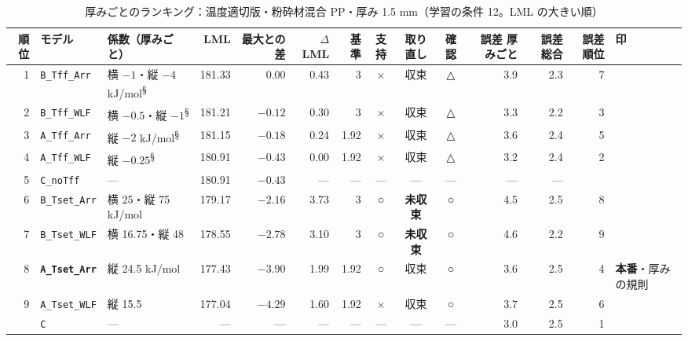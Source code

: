 \documentclass[paper=a4paper,landscape,fontsize=10pt,line_length=62zw,number_of_lines=34]{jlreq}
\let\origtextbf\textbf
\renewcommand{\textbf}[1]{\origtextbf{\gtfamily #1}}   %
\begin{document}
\begin{table}[H]\centering\footnotesize
\caption{厚みごとのランキング：温度適切版・粉砕材混合 PP・厚み 1.5 mm（学習の条件 12。LML の大きい順）}
\begin{tabular}{rlp{11\zw}rrrrccc rrrl}
\toprule
順位 & モデル & 係数（厚みごと） & LML & 最大との差 & $\Delta$LML & 基準 & 支持 & 取り直し & 確認 & 誤差 厚みごと & 誤差 総合 & 誤差順位 & 印 \\
\midrule
1 & \texttt{B\_\allowbreak{}Tff\_\allowbreak{}Arr} & 横 $-1$・縦 $-4$ kJ/mol\textsuperscript{§} & 181.33 & 0.00 & 0.43 & 3 & × & 収束 & △ & 3.9 & 2.3 & 7 &  \\
2 & \texttt{B\_\allowbreak{}Tff\_\allowbreak{}WLF} & 横 $-0.5$・縦 $-1$\textsuperscript{§} & 181.21 & $-0.12$ & 0.30 & 3 & × & 収束 & △ & 3.3 & 2.2 & 3 &  \\
3 & \texttt{A\_\allowbreak{}Tff\_\allowbreak{}Arr} & 縦 $-2$ kJ/mol\textsuperscript{§} & 181.15 & $-0.18$ & 0.24 & 1.92 & × & 収束 & △ & 3.6 & 2.4 & 5 &  \\
4 & \texttt{A\_\allowbreak{}Tff\_\allowbreak{}WLF} & 縦 $-0.25$\textsuperscript{§} & 180.91 & $-0.43$ & 0.00 & 1.92 & × & 収束 & △ & 3.2 & 2.4 & 2 &  \\
5 & \texttt{C\_\allowbreak{}noTff} & --- & 180.91 & $-0.43$ & --- & --- & --- & --- & --- & --- & --- &  &  \\
6 & \texttt{B\_\allowbreak{}Tset\_\allowbreak{}Arr} & 横 25・縦 75 kJ/mol & 179.17 & $-2.16$ & 3.73 & 3 & ○ & \textbf{未収束} & ○ & 4.5 & 2.5 & 8 &  \\
7 & \texttt{B\_\allowbreak{}Tset\_\allowbreak{}WLF} & 横 16.75・縦 48 & 178.55 & $-2.78$ & 3.10 & 3 & ○ & \textbf{未収束} & ○ & 4.6 & 2.2 & 9 &  \\
8 & \textbf{\texttt{A\_\allowbreak{}Tset\_\allowbreak{}Arr}} & 縦 24.5 kJ/mol & 177.43 & $-3.90$ & 1.99 & 1.92 & ○ & 収束 & ○ & 3.6 & 2.5 & 4 & \textbf{本番}・厚みの規則 \\
9 & \texttt{A\_\allowbreak{}Tset\_\allowbreak{}WLF} & 縦 15.5 & 177.04 & $-4.29$ & 1.60 & 1.92 & × & 収束 & ○ & 3.7 & 2.5 & 6 &  \\
 & \texttt{C} & --- & --- & --- & --- & --- & --- & --- & --- & 3.0 & 2.5 & 1 &  \\
\bottomrule
\end{tabular}
\end{table}
\end{document}
